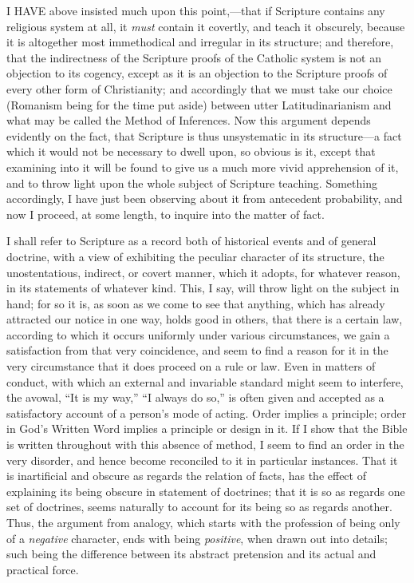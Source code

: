 
I HAVE above insisted much upon this point,—that if
Scripture contains any religious system at all, it \emph{must} contain
it covertly, and teach it obscurely, because it is altogether most
immethodical and irregular in its structure; and therefore, that the
indirectness of the Scripture proofs of the Catholic system is not an
objection to its cogency, except as it is an objection to the
Scripture proofs of every other form of Christianity; and accordingly
that we must take our choice (Romanism being for the time put aside)
between utter Latitudinarianism and what may be called the Method of
Inferences. Now this argument depends evidently on the fact, that
Scripture is thus unsystematic in its structure—a fact which it
would not be necessary to dwell upon, so obvious is it, except that
examining into it will be found to give us a much more vivid
apprehension of it, and to throw light upon the whole subject of
Scripture teaching. Something accordingly, I have just been observing
about it from antecedent probability, and now I proceed, at some
length, to inquire into the matter of fact.

I shall refer to Scripture as a record both of historical events
and of general doctrine, with a view of exhibiting the peculiar
character of its structure, the unostentatious, indirect, or covert
manner, which it adopts, for whatever reason, in its statements
of whatever kind. This, I say, will throw light on the subject in
hand; for so it is, as soon as we come to see that anything, which has
already attracted our notice in one way, holds good in others, that
there is a certain law, according to which it occurs uniformly under
various circumstances, we gain a satisfaction from that very
coincidence, and seem to find a reason for it in the very circumstance
that it does proceed on a rule or law. Even in matters of conduct,
with which an external and invariable standard might seem to
interfere, the avowal, ``It is my way,'' ``I always do
so,'' is often given and accepted as a satisfactory account of a
person's mode of acting. Order implies a principle; order in God's
Written Word implies a principle or design in it. If I show that the
Bible is written throughout with this absence of method, I seem to
find an order in the very disorder, and hence become reconciled to it
in particular instances. That it is inartificial and obscure as
regards the relation of facts, has the effect of explaining its being
obscure in statement of doctrines; that it is so as regards one set of
doctrines, seems naturally to account for its being so as regards
another. Thus, the argument from analogy, which starts with the
profession of being only of a \emph{negative} character, ends with
being \emph{positive}, when drawn out into details; such being the
difference between its abstract pretension and its actual and
practical force.

